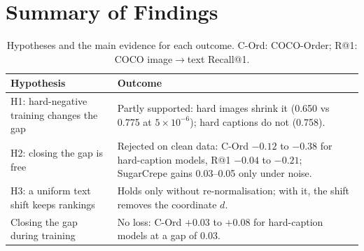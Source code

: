 \documentclass{article}
\begin{document}
\section{Summary of Findings}
\label{app:summary}

\begin{table}[H]
\caption{Hypotheses and the main evidence for each outcome. C-Ord: COCO-Order; R@1: COCO image$\to$text Recall@1.}
\label{tab:summary}
\begin{center}
\begin{small}
\begin{tabular}{@{}>{\raggedright\arraybackslash}p{}>{\raggedright\arraybackslash}p{}@{}}
\toprule
Hypothesis & Outcome \\
\midrule
H1: hard-negative training changes the gap & Partly supported: hard images shrink it (0.650 vs 0.775 at $5{\times}10^{-6}$); hard captions do not (0.758). \\
H2: closing the gap is free & Rejected on clean data: C-Ord $-0.12$ to $-0.38$ for hard-caption models, R@1 $-0.04$ to $-0.21$; SugarCrepe gains 0.03--0.05 only under noise. \\
H3: a uniform text shift keeps rankings & Holds only without re-normalisation; with it, the shift removes the coordinate $d$. \\
Closing the gap during training & No loss: C-Ord $+0.03$ to $+0.08$ for hard-caption models at a gap of 0.03. \\
\bottomrule
\end{tabular}
\end{small}
\end{center}
\end{table}
\end{document}
